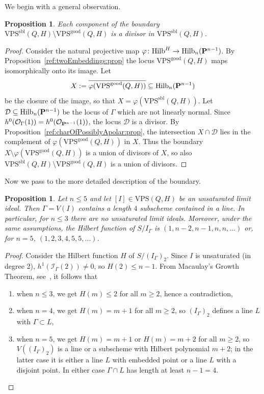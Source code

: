 \documentclass{amsart}
\newcommand{\Hilb}{{\rm{Hilb}}}
\newcommand{\PP}{{\bf P}}
\newcommand{\OO}{{\mathcal{O}}}
\newcommand{\Hvanilla}{\Hilb_{n}(\PP^{n-1})}
\newcommand{\VPSsbl}{{\mathrm{VPS}}^{\mathrm{sbl}}(Q, H)}
\newcommand{\VPSgood}{{\mathrm{VPS}}^{\mathrm{good}}(Q, H)}
\newcommand{\VPS}{\mathrm{VPS}(Q, H)}
\newtheorem{proposition}[lemma]{\bf Proposition}
\begin{document}
We begin with a
general observation.
\begin{proposition}
    Each component of the boundary $\VPSsbl \setminus \VPSgood$ is a divisor
    in $\VPSsbl$.
\end{proposition}
\begin{proof}
    Consider the natural projective map $\varphi\colon \Hilb^H\to \Hvanilla$. By
    Proposition~\ref{ref:twoEmbeddings:prop} the locus $\VPSgood$ maps
    isomorphically onto its image. Let
    \[
        X := \overline{\varphi(\VPSgood)}\subseteq
        \Hvanilla
    \]
    be the closure of the image, so that $X = \varphi(\VPSsbl)$.
    Let $\mathcal{D}\subseteq \Hvanilla$ be the locus of $\Gamma$ which are
    not linearly normal. Since $h^0(\OO_{\Gamma}(1)) =
    h^0(\OO_{\PP^{n-1}}(1))$, the locus $\mathcal{D}$ is a divisor. By
    Proposition~\ref{ref:charOfPossiblyApolar:prop}, the intersection
    $X \cap \mathcal{D}$ lies in the complement of 
    $\varphi(\VPSgood)$ in $X$. Thus the
    boundary $X\setminus\varphi(\VPSgood)$ is a
    union of divisors of $X$, so also
    $\VPSsbl\setminus \VPSgood$ is a union of divisors.
\end{proof}

Now we pass to the more detailed description of the boundary.
\begin{proposition}\label{prop:regularity}
    Let $n\leq 5$ and let $[I]\in \VPS$ be an unsaturated limit ideal. Then $\Gamma=V(I)$
    contains a length $4$ subscheme contained in a line. In particular, for
    $n\leq 3$ there are no unsaturated limit ideals. Moreover, under the same assumptions, the Hilbert function of $S/{I_\Gamma}$ is $(1,n-2,n-1,n,n,\ldots)$ or, for $n=5$, $(1,2,3,4,5,5,\ldots)$.
\end{proposition}

\begin{proof}
    Consider the Hilbert function $H$ of $S/(I_\Gamma)_2$. Since $I$ is
    unsaturated (in degree 2), $h^1(\mathcal{I}_{\Gamma}(2)) \neq 0$, so $H(2) \leq n-1$.
    From Macaulay's Growth Theorem, see~\cite[\S2E and Lemma~2.9]{cjn13}, it
    follows that
    \begin{enumerate}
        \item when $n\leq 3$, we get $H(m)\leq 2$ for all $m\geq 2$, hence a
            contradiction,
        \item when $n=4$, we get $H(m) = m+1$ for all $m\geq 2$, so
            $(I_{\Gamma})_2$ defines a line $L$ with $\Gamma \subset L$,
        \item when $n=5$, we get $H(m) = m+1$ or $H(m) = m+2$ for all $m\geq 2$, so
            $V((I_{\Gamma})_2)$ is a line or a subscheme with Hilbert polynomial $m+2$;
            in the latter case it is either a line $L$ with embedded point or a line $L$ with a
            disjoint point. In either case $\Gamma\cap L$ has length at least
            $n-1 = 4$.\qedhere
    \end{enumerate}
\end{proof}
\end{document}
